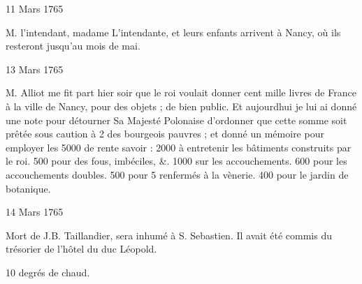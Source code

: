                      \begin{diary}{11 Mars 1765}{}


                           M. l'intendant, madame L'intendante, et leurs
                           enfants arrivent à Nancy, où ils
                           resteront
                           jusqu'au mois de mai.
                        \bigskip


                     \end{diary}

                     \begin{diary}{13 Mars 1765}{}


                           M. Alliot me fit part hier soir que
                              le roi
                           voulait donner cent mille livres de France à la ville
                              de Nancy, pour des objets ; de bien public. Et
                           aujourdhui je lui ai donné une note pour détourner
                              Sa Majesté Polonaise d'ordonner que cette somme soit
                           prêtée sous caution à 2 %
                           des bourgeois pauvres ; et donné un mémoire
                           pour employer les 5000 de rente savoir :
                           2000 à entretenir les bâtiments construits
                           par le roi. 500
                           pour des fous, imbéciles, \&.
                           1000 sur les accouchements. 600 pour
                           les accouchements doubles. 500 pour 5
                           renfermés à la
                           vènerie. 400 pour le jardin
                              de botanique. \bigskip


                     \end{diary}

                     \begin{diary}{14 Mars 1765}{}

                         Mort de J.B. Taillandier, sera inhumé à S. Sebastien.
                           Il avait été commis du trésorier de l'hôtel du duc Léopold. \bigskip



                           10 degrés de chaud. \bigskip


                     \end{diary}

